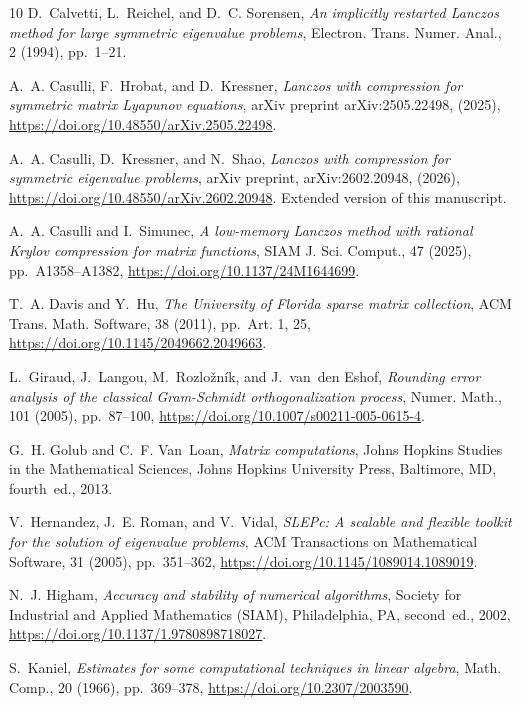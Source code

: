\documentclass{siamart190516}
\begin{document}
\begin{thebibliography}{10}
{\sc D.~Calvetti, L.~Reichel, and D.~C. Sorensen}, {\em An implicitly restarted {L}anczos method for large symmetric eigenvalue problems}, Electron. Trans. Numer. Anal., 2 (1994), pp.~1--21.

{\sc A.~A. Casulli, F.~Hrobat, and D.~Kressner}, {\em Lanczos with compression for symmetric matrix {L}yapunov equations}, arXiv preprint arXiv:2505.22498,  (2025), \url{https://doi.org/10.48550/arXiv.2505.22498}.

{\sc A.~A. Casulli, D.~Kressner, and N.~Shao}, {\em Lanczos with compression for symmetric eigenvalue problems}, arXiv preprint, arXiv:2602.20948,  (2026), \url{https://doi.org/10.48550/arXiv.2602.20948}.
\newblock Extended version of this manuscript.

{\sc A.~A. Casulli and I.~Simunec}, {\em A low-memory {L}anczos method with rational {K}rylov compression for matrix functions}, SIAM J. Sci. Comput., 47 (2025), pp.~A1358--A1382, \url{https://doi.org/10.1137/24M1644699}.

{\sc T.~A. Davis and Y.~Hu}, {\em The {U}niversity of {F}lorida sparse matrix collection}, ACM Trans. Math. Software, 38 (2011), pp.~Art. 1, 25, \url{https://doi.org/10.1145/2049662.2049663}.

{\sc L.~Giraud, J.~Langou, M.~Rozlo\v{z}n\'ik, and J.~van~den Eshof}, {\em Rounding error analysis of the classical {G}ram-{S}chmidt orthogonalization process}, Numer. Math., 101 (2005), pp.~87--100, \url{https://doi.org/10.1007/s00211-005-0615-4}.

{\sc G.~H. Golub and C.~F. Van~Loan}, {\em Matrix computations}, Johns Hopkins Studies in the Mathematical Sciences, Johns Hopkins University Press, Baltimore, MD, fourth~ed., 2013.

{\sc V.~Hernandez, J.~E. Roman, and V.~Vidal}, {\em {SLEPc}: A scalable and flexible toolkit for the solution of eigenvalue problems}, ACM Transactions on Mathematical Software, 31 (2005), pp.~351--362, \url{https://doi.org/10.1145/1089014.1089019}.

{\sc N.~J. Higham}, {\em Accuracy and stability of numerical algorithms}, Society for Industrial and Applied Mathematics (SIAM), Philadelphia, PA, second~ed., 2002, \url{https://doi.org/10.1137/1.9780898718027}.

{\sc S.~Kaniel}, {\em Estimates for some computational techniques in linear algebra}, Math. Comp., 20 (1966), pp.~369--378, \url{https://doi.org/10.2307/2003590}.


\end{thebibliography}
\end{document}
